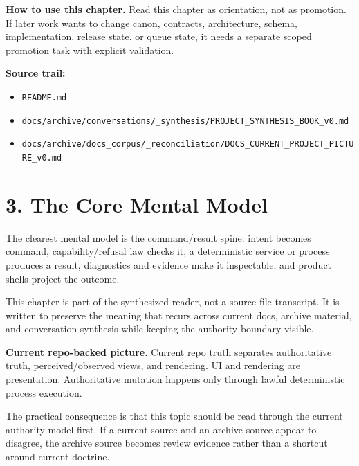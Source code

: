 \documentclass[10.5pt,a4paper,openany]{book}
\begin{document}
\textbf{How to use this chapter.} Read this chapter as orientation, not as promotion.\allowbreak{} If later work wants to change canon, contracts, architecture, schema, implementation, release state, or queue state, it needs a separate scoped promotion task with explicit validation.\allowbreak{}


\textbf{Source trail:}


\begin{itemize}
\item \texttt{README.\allowbreak{}md}
\item \texttt{docs/\allowbreak{}archive/\allowbreak{}conversations/\allowbreak{}\_\allowbreak{}synthesis/\allowbreak{}PROJECT\_\allowbreak{}SYNTHESIS\_\allowbreak{}BOOK\_\allowbreak{}v0.\allowbreak{}md}
\item \texttt{docs/\allowbreak{}archive/\allowbreak{}docs\_\allowbreak{}corpus/\allowbreak{}\_\allowbreak{}reconciliation/\allowbreak{}DOCS\_\allowbreak{}CURRENT\_\allowbreak{}PROJECT\_\allowbreak{}PICTURE\_\allowbreak{}v0.\allowbreak{}md}
\end{itemize}


\section{3. The Core Mental Model}

The clearest mental model is the command/\allowbreak{}result spine: intent becomes command, capability/\allowbreak{}refusal law checks it, a deterministic service or process produces a result, diagnostics and evidence make it inspectable, and product shells project the outcome.\allowbreak{}


This chapter is part of the synthesized reader, not a source-\allowbreak{}file transcript.\allowbreak{} It is written to preserve the meaning that recurs across current docs, archive material, and conversation synthesis while keeping the authority boundary visible.\allowbreak{}


\textbf{Current repo-backed picture.} Current repo truth separates authoritative truth, perceived/\allowbreak{}observed views, and rendering.\allowbreak{} UI and rendering are presentation.\allowbreak{} Authoritative mutation happens only through lawful deterministic process execution.\allowbreak{}


The practical consequence is that this topic should be read through the current authority model first.\allowbreak{} If a current source and an archive source appear to disagree, the archive source becomes review evidence rather than a shortcut around current doctrine.\allowbreak{}
\end{document}
